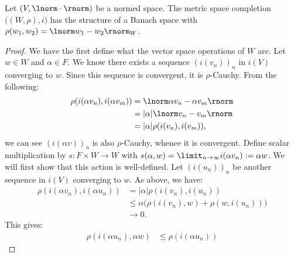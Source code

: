     \begin{theorem}
        Let $(V,\lnorm \cdot \rnorm)$ be a normed space. The metric space completion $\bigl((W,\rho),i\bigr)$ has the structure of a Banach space with $\rho(w_1,w_2) = \lnorm w_1 - w_2 \rnorm_W$.
    \end{theorem}
        \begin{proof}
            We have the first define what the vector space operations of $W$ are. Let $w \in W$ and $\alpha \in F$. We know there exists a sequence $(i(v_n))_n$ in $i(V)$ converging to $w$. Since this sequence is convergent, it is $\rho$-Cauchy. From the following:
                \begin{equation*}
                \begin{split}
                    \rho(i(\alpha v_n), i(\alpha v_m))
                    & = \lnorm \alpha v_n - \alpha v_m \rnorm \\
                    & = |\alpha| \lnorm v_n - v_m \rnorm \\
                    & = |\alpha| \rho(i(v_n),i(v_m)),
                \end{split}
                \end{equation*}
            we can see $(i(\alpha v))_n$ is also $\rho$-Cauchy, whence it is convergent. Define scalar multiplication by $s:F \times W \rightarrow W$ with $s(\alpha,w) = \limit_{n \rightarrow \infty} i(\alpha v_n) := \alpha w$. We will first show that this action is well-defined. Let $(i(u_n))_n$ be another sequence in $i(V)$ converging to $w$. As above, we have:
                \begin{equation*}
                \begin{split}
                    \rho(i(\alpha v_n), i(\alpha u_n))
                    & = |\alpha| \rho(i(v_n), i( u_n)) \\
                    & \leq \alpha \bigl( \rho(i(v_n),w) + \rho(w, i(u_n))\bigr) \\
                    & \rightarrow 0.
                \end{split}
                \end{equation*}
            This gives:
                \begin{equation*}
                \begin{split}
                    \rho(i(\alpha u_n), \alpha w) 
                    & \leq \rho(i(\alpha u_n))
                \end{split}
                \end{equation*}
        \end{proof}